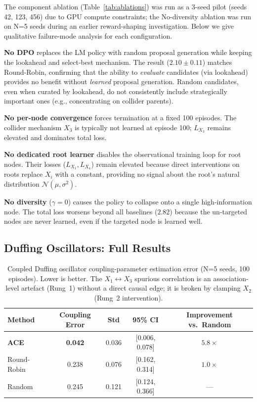 The component ablation (Table~\ref{tab:ablations}) was run as a 3-seed pilot (seeds 42, 123, 456) due to GPU compute constraints; the No-diversity ablation was run on N=5 seeds during an earlier reward-shaping investigation. Below we give qualitative failure-mode analysis for each configuration.

\textbf{No DPO} replaces the LM policy with random proposal generation while keeping the lookahead and select-best mechanism. The result ($2.10\pm0.11$) matches Round-Robin, confirming that the ability to \emph{evaluate} candidates (via lookahead) provides no benefit without \emph{learned} proposal generation. Random candidates, even when curated by lookahead, do not consistently include strategically important ones (e.g., concentrating on collider parents).

\textbf{No per-node convergence} forces termination at a fixed 100 episodes. The collider mechanism $X_3$ is typically not learned at episode 100; $L_{X_3}$ remains elevated and dominates total loss.

\textbf{No dedicated root learner} disables the observational training loop for root nodes. Their losses ($L_{X_1}, L_{X_4}$) remain elevated because direct interventions on roots replace $X_i$ with a constant, providing no signal about the root's natural distribution $\mathcal{N}(\mu, \sigma^2)$.

\textbf{No diversity} ($\gamma=0$) causes the policy to collapse onto a single high-information node. The total loss worsens beyond all baselines ($2.82$) because the un-targeted nodes are never learned, even if the targeted node is learned well.

\subsection{Duffing Oscillators: Full Results}
\label{app:duffing}

\begin{table}[h]
\centering
\caption{Coupled Duffing oscillator coupling-parameter estimation error (N=5 seeds, 100 episodes). Lower is better. The $X_1 \leftrightarrow X_3$ spurious correlation is an association-level artefact (Rung~1) without a direct causal edge; it is broken by clamping $X_2$ (Rung~2 intervention).}
\label{tab:duffing-full}
\small
\begin{tabular}{@{}lcccc@{}}
\toprule
Method & Coupling Error & Std & 95\% CI & Improvement vs.\ Random \\
\midrule
\textbf{ACE} & \textbf{0.042} & 0.036 & [0.006, 0.078] & $5.8\times$ \\
Round-Robin  & 0.238 & 0.076 & [0.162, 0.314] & $1.0\times$ \\
Random       & 0.245 & 0.121 & [0.124, 0.366] & --- \\
\bottomrule
\end{tabular}
\end{table}

